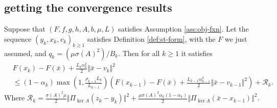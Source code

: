 \documentclass[12pt]{article}
\begin{document}
    \subsection{getting the convergence results}
        \begin{theorem}\label{thm:cnvg-generic}
            Suppose that $(F, f, g, h, A, b, \mu, L)$ satisfies Assumption \ref{ass:obj-fxn}. 
            Let the sequence $(y_k, x_k, v_k)_{k \ge 1}$ satisfies Definition \ref{def:st-form}, with the $F$ we just assumed, and $q_k = (\mu\sigma(A)^2)/B_k$. 
            Then for all $k \ge 1$ it satisfies 
            \begin{align*}
                & F(x_k) - F(\bar x) 
                + \frac{L_k\alpha_k^2}{2}\Vert \bar x - v_k\Vert^2
                \\
                &\le 
                (1 - \alpha_k)\max\left(
                    1, \frac{\rho_{k - 1}L_k}{L_{k - 1}}
                \right)\left(
                    F(x_{k - 1}) - F(\bar x) 
                    + \frac{L_{k - 1}\alpha_{k - 1}^2}{2}\Vert \bar x - v_{k - 1}\Vert^2
                \right) + \mathcal R_k. 
            \end{align*}
            Where $\mathcal R_k = \frac{\sigma(A)^2\mu}{2}\Vert \Pi_{\ker A}(z_k - y_k)\Vert^2 + \frac{\mu\sigma(A)^2\alpha_k(1 - \alpha_k)}{2}\Vert \Pi_{\ker A}(\bar x - x_{k - 1})\Vert^2$. 
        \end{theorem}
\end{document}
